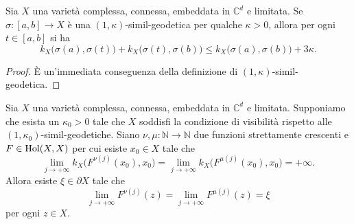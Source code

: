 \begin{lm} \label{quasiovvio}
    Sia $X$ una varietà complessa, connessa, embeddata in $\mathbb{C}^d$ e limitata. Se $\sigma:[a,b] \longrightarrow X$ è una $(1,\kappa)$-simil-geodetica per qualche $\kappa>0$, allora per ogni $t \in [a,b]$ si ha
    $$k_X\big(\sigma(a),\sigma(t)\big)+k_X\big(\sigma(t),\sigma(b)\big) \le k_X\big(\sigma(a),\sigma(b)\big)+3\kappa.$$
\end{lm}

\begin{proof}
    È un'immediata conseguenza della definizione di $(1,\kappa)$-simil-geodetica.
\end{proof}

\begin{prop} \label{inf_impl_ugu}
    Sia $X$ una varietà complessa, connessa, embeddata in $\mathbb{C}^d$ e limitata. Supponiamo che esista un $\kappa_0>0$ tale che $X$ soddisfi la condizione di visibilità rispetto alle $(1,\kappa_0)$-simil-geodetiche. Siano $\nu,\mu:\mathbb{N}\longrightarrow\mathbb{N}$ due funzioni strettamente crescenti e $F\in\textnormal{Hol}(X,X)$ per cui esiste $x_0 \in X$ tale che
    $$\lim_{j\longrightarrow+\infty} k_X\big(F^{\nu(j)}(x_0),x_0\big)=\lim_{j\longrightarrow+\infty} k_X\big(F^{\mu(j)}(x_0),x_0\big)=+\infty.$$
    Allora esiste $\xi\in\partial X$ tale che
    $$\lim_{j\longrightarrow+\infty} F^{\nu(j)}(z)=\lim_{j\longrightarrow+\infty} F^{\mu(j)}(z)=\xi$$
    per ogni $z \in X$.
\end{prop}

